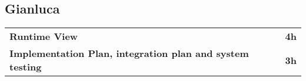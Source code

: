 \subsection*{Gianluca}
\begin{table}[H]
    \begin{tabular}{lr}
        \toprule
        \textbf{Runtime View}                                                  & \textbf{4h} \\
        \textbf{Implementation Plan, integration plan and system testing}      & \textbf{3h} \\
        \bottomrule
    \end{tabular}
\end{table}